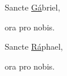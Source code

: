 \begin{multicols}{2}
\renewcommand{\columnseprulecolor}{\color{rubrica}}
\renewcommand{\columnseprule}{0.4pt}

\va Sancte {\underline {Gá}}briel,

\ra ora pro nobis.

\va Sancte {\underline {Rá}}phael,

\ra ora pro nobis.

\end{multicols}
